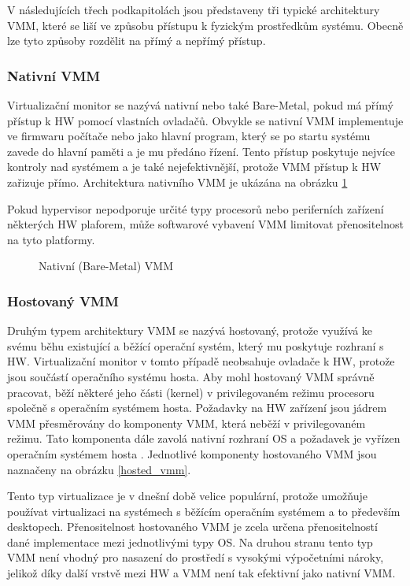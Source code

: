 V následujících třech podkapitolách jsou představeny tři typické architektury VMM, které se liší ve způsobu přístupu k fyzickým prostředkům systému. Obecně lze tyto způsoby rozdělit na přímý a nepřímý přístup.

\subsubsection*{Nativní VMM}

Virtualizační monitor se nazývá nativní nebo také Bare-Metal, pokud má přímý přístup k HW pomocí vlastních ovladačů. Obvykle se nativní VMM implementuje ve firmwaru počítače nebo jako hlavní program, který se po startu
systému  zavede do hlavní paměti a je mu předáno řízení. Tento přístup poskytuje nejvíce kontroly nad systémem a je také nejefektivnější, protože VMM přístup k HW zařizuje přímo. Architektura nativního VMM je ukázána na 
obrázku \ref{native_vmm}

Pokud hypervisor nepodporuje určité typy procesorů nebo periferních zařízení některých HW plaforem, může softwarové vybavení VMM limitovat přenositelnost na tyto platformy.\cite{vmm1}

\begin{figure}
    \centering    
    \caption{Nativní (Bare-Metal) VMM}
    \label{native_vmm}
\end{figure}

\subsubsection*{Hostovaný VMM}

Druhým typem architektury VMM se nazývá hostovaný, protože využívá ke svému běhu existující a běžící operační systém, který mu poskytuje rozhraní s HW. Virtualizační monitor v tomto případě neobsahuje ovladače k HW, protože jsou
součástí operačního systému hosta. Aby mohl hostovaný VMM správně pracovat, běží některé jeho části (kernel) v privilegovaném režimu procesoru společně s operačním systémem hosta. Požadavky na HW zařízení jsou jádrem VMM přesměrovány
do komponenty VMM, která neběží v privilegovaném režimu. Tato komponenta dále zavolá nativní rozhraní OS a požadavek je vyřízen operačním systémem hosta \cite{vmm1}. Jednotlivé komponenty hostovaného VMM jsou naznačeny na obrázku \ref{hosted_vmm}.

Tento typ virtualizace je v dnešní době velice populární, protože umožňuje používat virtualizaci na systémech s běžícím operačním systémem a to především desktopech. Přenositelnost hostovaného VMM je zcela určena přenositelností 
dané implementace mezi jednotlivými typy OS. Na druhou stranu tento typ VMM není vhodný pro nasazení do prostředí s vysokými výpočetními nároky, jelikož díky další vrstvě mezi HW a VMM není tak efektivní jako nativní VMM.

